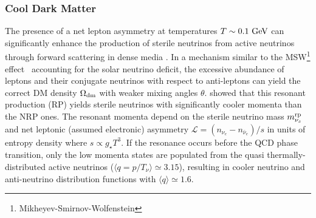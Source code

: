 \subsubsection{Cool Dark Matter}
\label{sec:rpsn_intro}

The presence of a net lepton asymmetry at temperatures $T \sim 0.1~\rm{GeV}$
can significantly enhance the production of sterile neutrinos from active
neutrinos through forward scattering in dense media \citep{ShiFuller99}. In a mechanism similar to the MSW\footnote{Mikheyev-Smirnov-Wolfenstein} effect~\citep{Mikheev1986gs, Wolfenstein1977ue} accounting for the solar neutrino deficit, the excessive abundance of leptons and their conjugate neutrinos with respect to anti-leptons can yield the correct DM density $\Omega_{\rm{dm}}$ with weaker mixing angles $\theta$. \cite{ShiFuller99} showed that this resonant production (RP) yields sterile neutrinos with significantly cooler momenta than the NRP ones. The resonant momenta depend on the sterile neutrino mass $m_{\nu_s}^{\rm{rp}}$ and net leptonic (assumed electronic) asymmetry $\mathcal{L} = (n_{\nu_e} - n_{\bar{\nu}_e}) / s$ in units of entropy density where $s \propto g_\star T^3$. If the resonance occurs before the QCD phase transition, only the low momenta states are populated from the quasi thermally-distributed active neutrinos ($\langle q = p/T_\nu \rangle \simeq 3.15$), resulting in cooler neutrino and anti-neutrino distribution functions with $\langle q \rangle \simeq 1.6$. \\

